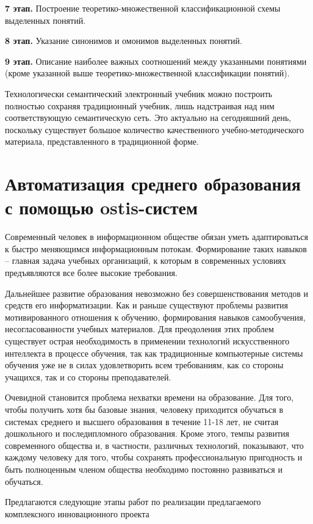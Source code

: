\textbf{7 этап.} Построение теоретико-множественной классификационной схемы выделенных понятий.

\textbf{8 этап.} Указание синонимов и омонимов выделенных понятий.

\textbf{9 этап.} Описание наиболее важных соотношений между указанными понятиями (кроме указанной выше теоретико-множественной классификации понятий).

Технологически семантический электронный учебник можно построить полностью сохраняя традиционный учебник, лишь надстраивая над ним соответствующую семантическую сеть. Это актуально на сегодняшний день, поскольку существует большое количество качественного учебно-методического материала, представленного в традиционной форме.

\section{Автоматизация среднего образования с помощью ostis-систем}

Современный человек в информационном обществе обязан уметь адаптироваться к быстро меняющимся информационным потокам. Формирование таких навыков -- главная задача учебных организаций, к которым в современных условиях предъявляются все более высокие требования.

Дальнейшее развитие образования невозможно без совершенствования методов и средств его информатизации. Как и раньше существуют проблемы развития мотивированного отношения к обучению, формирования навыков самообучения, несогласованности учебных материалов. Для преодоления этих проблем существует острая необходимость в применении технологий искусственного интеллекта в процессе обучения, так как традиционные компьютерные системы обучения уже не в силах удовлетворить всем требованиям, как со стороны учащихся, так и со стороны преподавателей.

Очевидной становится проблема нехватки времени на образование. Для того, чтобы получить хотя бы базовые знания, человеку приходится обучаться в системах среднего и высшего образования в течение 11-18 лет, не считая дошкольного и последипломного образования. Кроме этого, темпы развития современного общества и, в частности, различных технологий, показывают, что каждому человеку для того, чтобы сохранять профессиональную пригодность и быть полноценным членом общества необходимо постоянно развиваться и обучаться.

Предлагаются следующие этапы работ по реализации предлагаемого комплексного инновационного проекта

